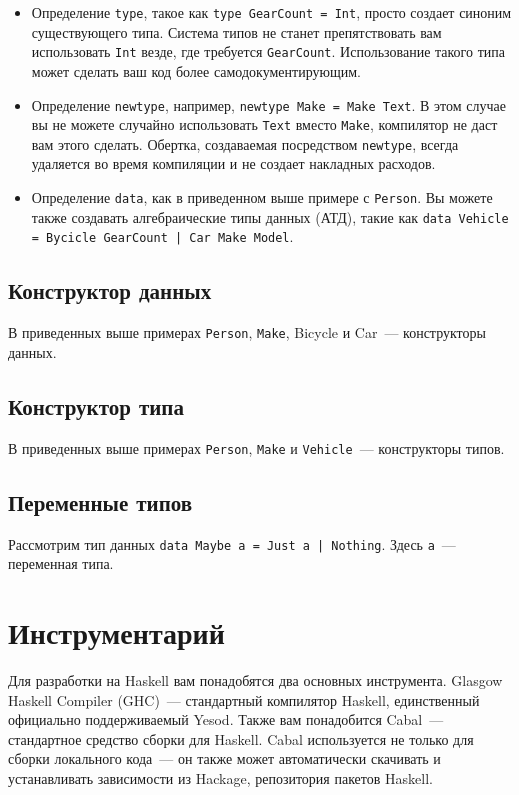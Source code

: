 \begin{itemize}
  \item Определение \lstinline'type', такое как \lstinline'type GearCount = Int', просто создает синоним существующего типа. Система типов не станет препятствовать вам использовать \lstinline'Int' везде, где требуется \lstinline'GearCount'. Использование такого типа может сделать ваш код более самодокументирующим.
  \item Определение \lstinline'newtype', например, \lstinline'newtype Make = Make Text'. В этом случае вы не можете случайно использовать \lstinline'Text' вместо \lstinline'Make', компилятор не даст вам этого сделать. Обертка, создаваемая посредством \lstinline'newtype', всегда удаляется во время компиляции и не создает накладных расходов.
  \item Определение \lstinline'data', как в приведенном выше примере с \lstinline'Person'. Вы можете также создавать алгебраические типы данных (АТД), такие как \lstinline'data Vehicle = Bycicle GearCount | Car Make Model'.
\end{itemize}

\subsection{Конструктор данных}

В приведенных выше примерах \lstinline'Person', \lstinline'Make', Bicycle и Car~--- конструкторы данных.

\subsection{Конструктор типа}

В приведенных выше примерах \lstinline'Person', \lstinline'Make' и \lstinline'Vehicle'~--- конструкторы типов.

\subsection{Переменные типов}

Рассмотрим тип данных \lstinline'data Maybe a = Just a | Nothing'. Здесь \lstinline'a'~--- переменная типа.

\section{Инструментарий}

Для разработки на Haskell вам понадобятся два основных инструмента. Glasgow Haskell Compiler (GHC)~--- стандартный компилятор Haskell, единственный официально поддерживаемый Yesod. Также вам понадобится Cabal~--- стандартное средство сборки для Haskell. Cabal используется не только для сборки локального кода~--- он также может автоматически скачивать и устанавливать зависимости из Hackage, репозитория пакетов Haskell.

